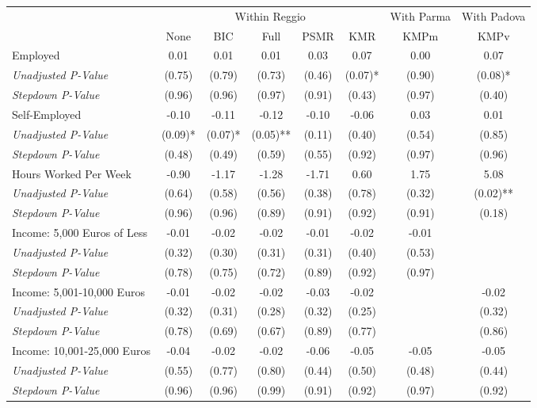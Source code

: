 \begin{tabular}{l c c c c c c c}
\toprule
& \multicolumn{5}{c}{Within Reggio} & With Parma & With Padova \\\cmidrule(lr){2-6} \cmidrule(lr){7-7} \cmidrule(lr){8-8}
 & None & BIC & Full & PSMR & KMR & KMPm & KMPv \\
\midrule
Employed & 0.01 & 0.01 & 0.01 & 0.03 & 0.07 & 0.00 & 0.07 \\
\quad \textit{Unadjusted P-Value} & (0.75) & (0.79) & (0.73) & (0.46) & (0.07)* & (0.90) & (0.08)* \\
\quad \textit{Stepdown P-Value} & (0.96) & (0.96) & (0.97) & (0.91) & (0.43) & (0.97) & (0.40) \\
Self-Employed & -0.10 & -0.11 & -0.12 & -0.10 & -0.06 & 0.03 & 0.01 \\
\quad \textit{Unadjusted P-Value} & (0.09)* & (0.07)* & (0.05)** & (0.11) & (0.40) & (0.54) & (0.85) \\
\quad \textit{Stepdown P-Value} & (0.48) & (0.49) & (0.59) & (0.55) & (0.92) & (0.97) & (0.96) \\
Hours Worked Per Week & -0.90 & -1.17 & -1.28 & -1.71 & 0.60 & 1.75 & 5.08 \\
\quad \textit{Unadjusted P-Value} & (0.64) & (0.58) & (0.56) & (0.38) & (0.78) & (0.32) & (0.02)** \\
\quad \textit{Stepdown P-Value} & (0.96) & (0.96) & (0.89) & (0.91) & (0.92) & (0.91) & (0.18) \\
Income: 5,000 Euros of Less & -0.01 & -0.02 & -0.02 & -0.01 & -0.02 & -0.01 &  \\
\quad \textit{Unadjusted P-Value} & (0.32) & (0.30) & (0.31) & (0.31) & (0.40) & (0.53) & \\
\quad \textit{Stepdown P-Value} & (0.78) & (0.75) & (0.72) & (0.89) & (0.92) & (0.97) &  \\
Income: 5,001-10,000 Euros & -0.01 & -0.02 & -0.02 & -0.03 & -0.02 &  & -0.02 \\
\quad \textit{Unadjusted P-Value} & (0.32) & (0.31) & (0.28) & (0.32) & (0.25) & & (0.32) \\
\quad \textit{Stepdown P-Value} & (0.78) & (0.69) & (0.67) & (0.89) & (0.77) &  & (0.86) \\
Income: 10,001-25,000 Euros & -0.04 & -0.02 & -0.02 & -0.06 & -0.05 & -0.05 & -0.05 \\
\quad \textit{Unadjusted P-Value} & (0.55) & (0.77) & (0.80) & (0.44) & (0.50) & (0.48) & (0.44) \\
\quad \textit{Stepdown P-Value} & (0.96) & (0.96) & (0.99) & (0.91) & (0.92) & (0.97) & (0.92) \\

\end{tabular}
